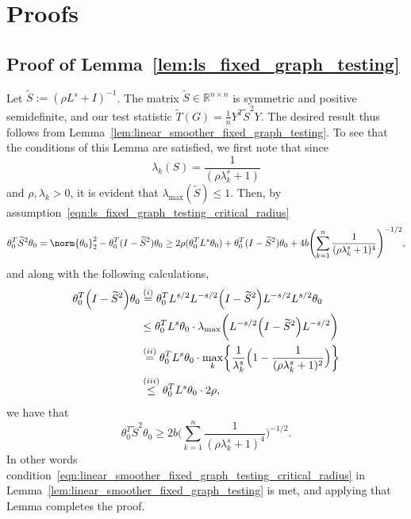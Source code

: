 \documentclass{article}
\newcommand{\Reals}{\mathbb{R}}
\newcommand{\1}{\mathbf{1}}
\newcommand{\Lap}{L}
\newcommand{\Id}{I}
\newcommand{\wt}[1]{\widetilde{#1}}
\theoremstyle{alden}
\theoremstyle{aldenthm}
\theoremstyle{definition}
\theoremstyle{remark}
\begin{document}
\section{Proofs}

\subsection{Proof of Lemma~\ref{lem:ls_fixed_graph_testing}}

Let $\wt{S} := (\rho \Lap^s + \Id)^{-1}$. The matrix $\wt{S} \in \Reals^{n \times n}$ is symmetric and positive semidefinite, and our test statistic $\wt{T}(G) = \frac{1}{n}Y^T \wt{S}^2 Y$. The desired result thus follows from Lemma~\ref{lem:linear_smoother_fixed_graph_testing}. To see that the conditions of this Lemma are satisfied, we first note that since
\begin{equation*}
\lambda_k(S) = \frac{1}{(\rho\lambda_k^s + 1)}
\end{equation*}
and $\rho, \lambda_k > 0$, it is evident that $\lambda_{\max}(\wt{S}) \leq 1$.  Then, by assumption~\eqref{eqn:ls_fixed_graph_testing_critical_radius}
\begin{equation*}
\theta_0^{T} \wt{S}^2 \theta_0 = \norm{\theta_0}_2^2 - \theta_0^T(I - \wt{S}^2)\theta_0 \geq 2 \rho (\theta_0^T \Lap^s \theta_0) + \theta_0^T(I - \wt{S}^2)\theta_0 + 4b \Biggl(\sum_{k = 1}^{n} \frac{1}{(\rho\lambda_k^s + 1)^4} \Biggr)^{-1/2},
\end{equation*}
and along with the following calculations,
\begin{equation*}
\begin{aligned}
\theta_0^T \Bigl(\Id - \wt{S}^2\Bigr) \theta_0  & \overset{(i)}{=} \theta_0^T L^{s/2} L^{-s/2}\Bigl(\Id - \wt{S}^2\Bigr) L^{-s/2} L^{s/2} \theta_0 \\ 
& \leq \theta_0^T L^{s} \theta_0 \cdot  \lambda_{\max}\biggl(L^{-s/2}\Bigl(\Id - \wt{S}^2\Bigr) L^{-s/2}\biggr) \\ 
& \overset{(ii)}{=}  \theta_0^T L^{s} \theta_0 \cdot \max_{k} \biggl\{ \frac{1}{\lambda_k^s} \Bigl(1 - \frac{1}{(\rho \lambda_k^s + 1)^2}\Bigr) \biggr\} \\
& \overset{(iii)}{\leq} \theta_0^T L^{s} \theta_0 \cdot 2\rho,
\end{aligned}
\end{equation*}
we have that
\begin{equation*}
\theta_0^{T} \wt{S}^2 \theta_0 \geq 2b \biggl(\sum_{k = 1}^{n} \frac{1}{(\rho\lambda_k^s + 1)^4} \biggr)^{-1/2}.
\end{equation*} 
In other words condition~\eqref{eqn:linear_smoother_fixed_graph_testing_critical_radius} in Lemma~\ref{lem:linear_smoother_fixed_graph_testing} is met, and applying that Lemma completes the proof.
\end{document}
